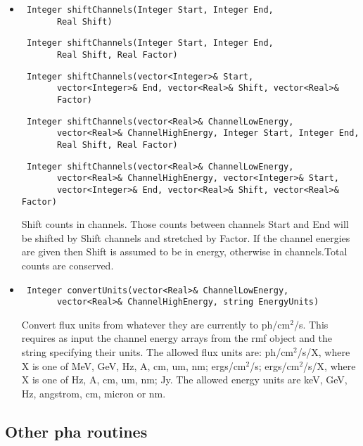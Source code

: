 \documentclass[11pt]{book}
\begin{document}
\begin{itemize}
\item  \begin{verbatim} Integer shiftChannels(Integer Start, Integer End,
       Real Shift) \end{verbatim}
       \begin{verbatim} Integer shiftChannels(Integer Start, Integer End, 
       Real Shift, Real Factor) \end{verbatim}
       \begin{verbatim} Integer shiftChannels(vector<Integer>& Start, 
       vector<Integer>& End, vector<Real>& Shift, vector<Real>&
       Factor) \end{verbatim}
       \begin{verbatim} Integer shiftChannels(vector<Real>& ChannelLowEnergy,
       vector<Real>& ChannelHighEnergy, Integer Start, Integer End, 
       Real Shift, Real Factor) \end{verbatim}
       \begin{verbatim} Integer shiftChannels(vector<Real>& ChannelLowEnergy,
       vector<Real>& ChannelHighEnergy, vector<Integer>& Start, 
       vector<Integer>& End, vector<Real>& Shift, vector<Real>& Factor) \end{verbatim}

           Shift counts in channels. Those counts between channels
           Start and End will be shifted by Shift channels and
           stretched by Factor. If the channel energies are given then
           Shift is assumed to be in energy, otherwise in channels.Total
           counts are conserved.
 
\item  \begin{verbatim} Integer convertUnits(vector<Real>& ChannelLowEnergy,
       vector<Real>& ChannelHighEnergy, string EnergyUnits) \end{verbatim}

           Convert flux units from whatever they are currently to 
           ph/cm$^2$/s. This requires as input the channel energy arrays 
           from the rmf object and the string specifying their
           units. The allowed flux units are: ph/cm$^2$/s/X, where X is
           one of MeV, GeV, Hz, A, cm, um, nm; ergs/cm$^2$/s;
           ergs/cm$^2$/s/X, where X is one of Hz, A, cm, um, nm;
           Jy. The allowed energy units are keV, GeV, Hz, angstrom,
           cm, micron or nm.

\end{itemize}

\subsection{Other pha routines}
\end{document}
